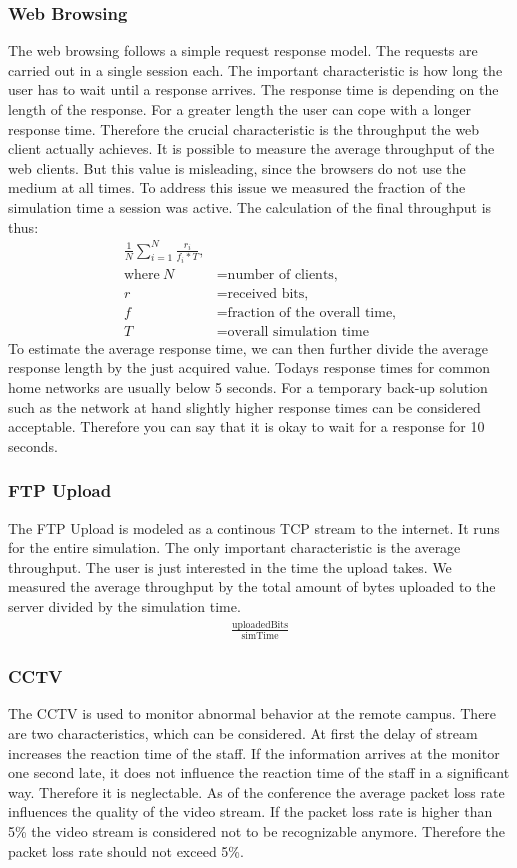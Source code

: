 \documentclass[
10pt, %
a4paper, %
oneside, %
headinclude,footinclude, %
BCOR5mm, %
]{scrartcl}
\begin{document}
\subsubsection{Web Browsing}
The web browsing follows a simple request response model. The requests are carried out in a single session each. The important characteristic is how long the user has to wait until a response arrives. The response time is depending on the length of the response. For a greater length the user can cope with a longer response time. Therefore the crucial characteristic is the throughput the web client actually achieves.
It is possible to measure the average throughput of the web clients. But this value is misleading, since the browsers do not use the medium at all times. To address this issue we measured the fraction of the simulation time a session was active. The calculation of the final throughput is thus:
\begin{align*}
\frac{1}{N}\sum_{i=1}^{N}\frac{r_{i}}{f_{i} * T}, \\
\text{where}~N &= \text{number of clients,} \\
r &= \text{received bits,} \\
f &= \text{fraction of the overall time,} \\
T &= \text{overall simulation time}
\end{align*}
To estimate the average response time, we can then further divide the average response length by the just acquired value.
Todays response times for common home networks are usually below 5 seconds. For a temporary back-up solution such as the network at hand slightly higher response times can be considered acceptable. Therefore you can say that it is okay to wait for a response for 10 seconds.

\subsubsection{FTP Upload}
The FTP Upload is modeled as a continous TCP stream to the internet. It runs for the entire simulation. The only important characteristic is the average throughput. The user is just interested in the time the upload takes. We measured the average throughput by the total amount of bytes uploaded to the server divided by the simulation time.
\begin{align*}
\frac{\text{uploadedBits}}{\text{simTime}}
\end{align*}

\subsubsection{CCTV}
The CCTV is used to monitor abnormal behavior at the remote campus. There are two characteristics, which can be considered. At first the delay of stream increases the reaction time of the staff. If the information arrives at the monitor one second late, it does not influence the reaction time of the staff in a significant way. Therefore it is neglectable.
As of the conference the average packet loss rate influences the quality of the video stream. If the packet loss rate is higher than 5\% the video stream is considered not to be recognizable anymore. Therefore the packet loss rate should not exceed 5\%.
\end{document}
